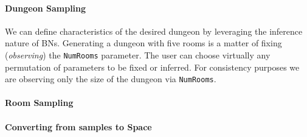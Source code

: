 \documentclass{UoYCSproject}
\begin{document}
\paragraph{Dungeon Sampling} %
We can define characteristics of the desired dungeon by leveraging the inference nature of BNs. Generating a dungeon with five rooms is a matter of fixing (\textit{observing}) the \texttt{NumRooms} parameter. The user can choose virtually any permutation of parameters to be fixed or inferred. For consistency purposes we are observing only the size of the dungeon via \texttt{NumRooms}.

\paragraph{Room Sampling}

\paragraph{Converting from samples to Space}
\end{document}
